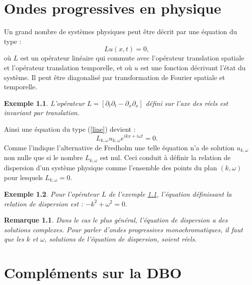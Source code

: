 \documentclass{book}
\newtheorem{exmp}{Exemple}[chapter]
\newtheorem{rem}{Remarque}[chapter]
\begin{document}
\chapter{Ondes progressives en physique}\label{annexeondes}

Un grand nombre de syst\`emes physiques  peut \^etre d\'ecrit par une
\'equation du type :
\begin{equation}\label{line}
Lu(x,t)=0,
\end{equation}
o\`u $L$ est un op\'erateur lin\'eaire qui commute avec l'op\'erateur
translation spatiale et l'op\'erateur
translation temporelle, et o\`u $u$ est une fonction d\'ecrivant
l'\'etat du syst\`eme.
Il peut \^etre diagonalis\'e par transformation de Fourier spatiale et 
temporelle.

\begin{exmp}\label{Londe}
L'op\'erateur
$L=[\partial_t \partial_t -\partial_x \partial_x]$
d\'efini sur l'axe des r\'eels est invariant par translation.
\end{exmp}
Ainsi une \'equation du type (\ref{line})
devient :
\begin{equation}
L_{k,\omega}u_{k,\omega}e^{i k x+i\omega t}=0.
\end{equation}
Comme l'indique l'alternative de Fredholm \cite{Manneville91}
une telle \'equation n'a de solution $u_{k,\omega}$ non nulle
que si le nombre $L_{k,\omega}$ est nul.
Ceci conduit \`a d\'efinir la relation de
dispersion d'un syst\`eme physique comme l'ensemble des points 
du plan $(k,\omega)$ pour lesquels $L_{k,\omega}=0$.

\begin{exmp}
Pour l'op\'erateur $L$ de l'exemple \ref{Londe}, l'\'equation
d\'efinissant la relation de dispersion est :
$-k^2+\omega^2=0$.
\end{exmp}

\begin{rem}
Dans le cas le plus g\'en\'eral, l'\'equation de dispersion
a des solutions complexes. Pour parler d'ondes progressives
monochromatiques, 
il faut que les $k$ et $\omega$, solutions de l'\'equation de
dispersion,  soient r\'eels.
\end{rem}

\chapter{Compl\'ements sur la DBO}
\end{document}
